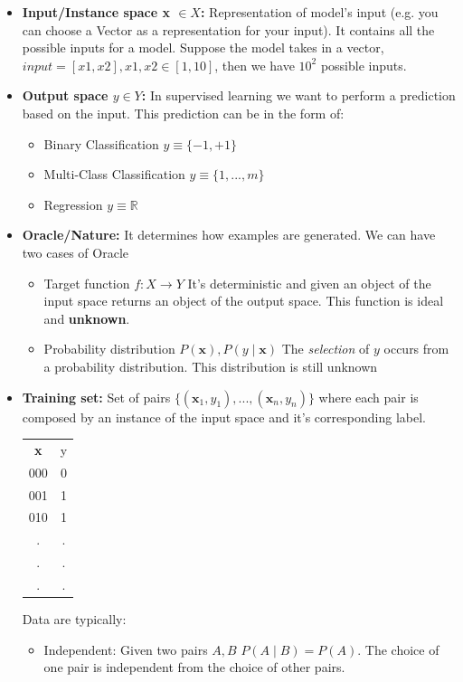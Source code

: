 \begin{itemize}
\item \textbf{Input/Instance space x $\in X$:}
Representation of model's input (e.g. you can choose a Vector as a representation for your input). It contains all the possible inputs for a model. Suppose the model takes in a vector, $input = [x1, x2], x1,x2 \in [1,10]$, then we have $10^2$ possible inputs.
\item \textbf{Output space $y \in Y$:}
In supervised learning we want to perform a prediction based on the input. This prediction can be in the form of:
\begin{itemize}
    \item Binary Classification $y \equiv \{-1, +1\}$
    \item Multi-Class Classification $y \equiv \{1,...,m\}$
    \item Regression $y \equiv \mathbb{R}$
\end{itemize}
\item \textbf{Oracle/Nature:}
It determines how examples are generated. We can have two cases of Oracle
\begin{itemize}
    \item Target function $f: X \rightarrow Y$ It's deterministic and given an object of the input space returns an object of the output space. This function is ideal and \textbf{unknown}.
    \item Probability distribution $P(\textbf{x}), P(y\mid\textbf{x})$ The \textit{selection} of $y$ occurs from a probability distribution. This distribution is still unknown
\end{itemize}
\item \textbf{Training set:}
Set of pairs $\{(\textbf{x}_{1}, y_{1}), ..., (\textbf{x}_{n}, y_{n}) \}$ where each pair is composed by an instance of the input space and it's corresponding label.
\begin{center}
    \begin{tabular}{c|c}
     \textbf{x} & y\\
     000&0  \\
     001&1 \\
     010&1 \\
     .&. \\
     .&. \\
     .&.\\
    \end{tabular}
\end{center}
Data are typically:
\begin{itemize}
    \item Independent: Given two pairs $A,B$ $P(A \mid B) = P(A)$. The choice of one pair is independent from the choice of other pairs.
    

\end{itemize}
\end{itemize}

